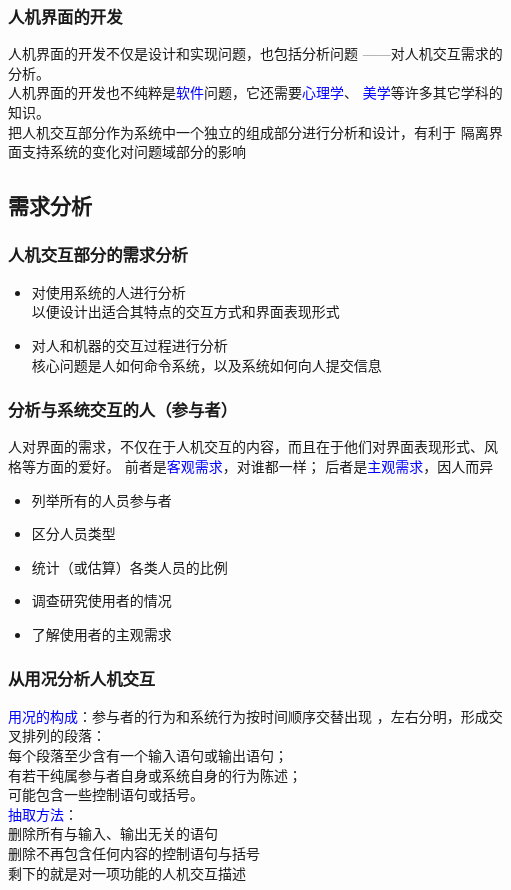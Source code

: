 \documentclass[compress]{beamer}
\begin{document}
\begin{frame}
  \frametitle{人机界面的开发}
  人机界面的开发不仅是设计和实现问题，也包括分析问题
  ——对人机交互需求的分析。 \\[2ex]
  人机界面的开发也不纯粹是\textcolor{blue}{软件}问题，它还需要\textcolor{blue}{心理学}、
  \textcolor{blue}{美学}等许多其它学科的知识。 \\[2ex]

  把人机交互部分作为系统中一个独立的组成部分进行分析和设计，有利于
  \alert{隔离}界面支持系统的变化对问题域部分的影响
\end{frame}


\subsection{需求分析}

\begin{frame}
  \frametitle{人机交互部分的需求分析}
  \begin{itemize}
    \item 对使用系统的人进行分析 \\
以便设计出适合其特点的交互方式和界面表现形式
\item 对人和机器的交互过程进行分析 \\
核心问题是人如何命令系统，以及系统如何向人提交信息
\end{itemize}
\end{frame}

\begin{frame}
  \frametitle{分析与系统交互的人（参与者）}
  人对界面的需求，不仅在于人机交互的内容，而且在于他们对界面表现形式、风
  格等方面的爱好。
  前者是\textcolor{blue}{客观需求}，对谁都一样；
  后者是\textcolor{blue}{主观需求}，因人而异

  \begin{itemize}
    \item 列举所有的人员参与者
    \item 区分人员类型
    \item 统计（或估算）各类人员的比例
    \item 调查研究使用者的情况
    \item 了解使用者的主观需求
  \end{itemize}

\end{frame}

\begin{frame}
  \frametitle{从用况分析人机交互}
  \textcolor{blue}{用况的构成}：参与者的行为和系统行为按时间顺序交替出现
  ，左右分明，形成交叉排列的段落： \\
    \quad 每个段落至少含有一个输入语句或输出语句； \\
    \quad 有若干纯属参与者自身或系统自身的行为陈述； \\
    \quad 可能包含一些控制语句或括号。 \\

    \textcolor{blue}{抽取方法}： \\
    \quad 删除所有与输入、输出无关的语句 \\
    \quad 删除不再包含任何内容的控制语句与括号 \\
    \quad 剩下的就是对一项功能的人机交互描述
\end{frame}
\end{document}
